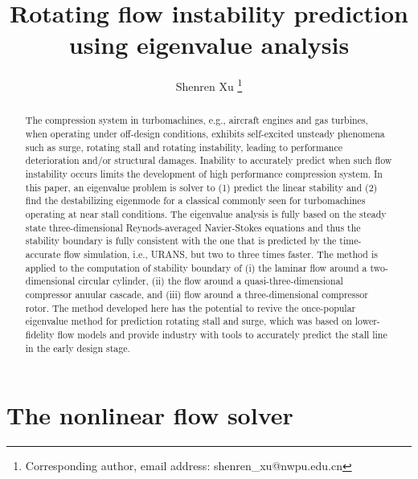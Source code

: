 \documentclass[journal,final]{new-aiaa}
\title{Rotating flow instability prediction using eigenvalue analysis}
\author[1]{Shenren Xu	
\footnote{ Corresponding author, email address: shenren\_xu@nwpu.edu.cn}}
\affil[1]{School of Power and Energy, 
	Northwestern Polytechnical University, Xi'an, 710072, China}
\begin{document}
\maketitle

\begin{abstract}
The compression system in turbomachines, e.g.,  aircraft engines and gas turbines,
when operating under off-design conditions, exhibits self-excited unsteady phenomena
such as surge, rotating stall and rotating instability, leading to performance deterioration
and/or structural damages. Inability to accurately predict when such flow instability occurs
limits the development of high performance compression system. In this paper,
an eigenvalue problem is solver to (1) predict the linear stability and (2) find the
destabilizing eigenmode for a classical 
commonly seen for turbomachines operating at near stall conditions. The eigenvalue
analysis is fully based on the steady state three-dimensional Reynods-averaged
Navier-Stokes equations and thus the stability boundary is fully consistent with
the one that is predicted by the time-accurate flow simulation, i.e., URANS, but
two to three times faster.
The method is applied to the computation of stability boundary of
(i) the laminar flow around a two-dimensional circular cylinder,
(ii) the flow around a quasi-three-dimensional compressor anuular cascade, 
and 
(iii) flow around a three-dimensional compressor rotor.
The method developed here has the potential to revive
the once-popular eigenvalue method for prediction rotating stall and surge, which
was based on lower-fidelity flow models and provide industry with tools to
accurately predict the stall line in the early design stage.
\end{abstract}

%

\section{The nonlinear flow solver}
\end{document}
